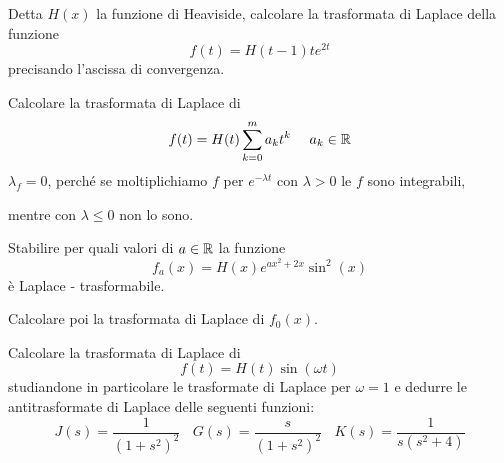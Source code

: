 Detta $\displaystyle H(x)$ la funzione di Heaviside, calcolare la trasformata di Laplace della funzione
\begin{equation*}
f(t) = H(t - 1) te^{2t}
\end{equation*}
precisando l'ascissa di convergenza.
\Esercizio{}

Calcolare la trasformata di Laplace di
\begin{equation*}
f(t) = H(t)\sum^{m}_{k = 0} a_{k} t^{k} \ \ \ \ a_{k} \in \RR 
\end{equation*}
$\displaystyle \lambda_{f} = 0$, perché se moltiplichiamo $\displaystyle f$ per $\displaystyle e^{- \lambda t}$ con $\displaystyle \lambda  > 0$ le $\displaystyle f$ sono integrabili, 

mentre con $\displaystyle \lambda \leq 0$ non lo sono.
\Esercizio{}

Stabilire per quali valori di $\displaystyle a\in \mathbb{R} $ la funzione
\begin{equation*}
f_{a}(x) = H(x) e^{ax^{2} + 2x}\sin^{2}(x)
\end{equation*}
è Laplace - trasformabile.

Calcolare poi la trasformata di Laplace di $\displaystyle f_{0}(x)$.
\Esercizio{}

Calcolare la trasformata di Laplace di
\begin{equation*}
f(t) = H(t)\sin(\omega t)
\end{equation*}
studiandone in particolare le trasformate di Laplace per $\displaystyle \omega = 1$ e dedurre le antitrasformate di Laplace delle seguenti funzioni:
\begin{equation*}
J(s) = \frac{1}{\left(1 + s^{2}\right)^{2}} \ \ \ \ G(s) = \frac{s}{\left(1 + s^{2}\right)^{2}} \ \ \ \ K(s) = \frac{1}{s\left(s^{2} + 4\right)}
\end{equation*}
\ParteSoluzioni
\Soluzione

